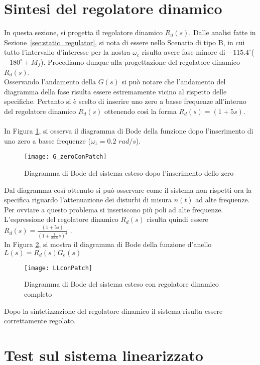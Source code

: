 \documentclass[a4paper, 11pt]{article}
\begin{document}
\section{Sintesi del regolatore dinamico}

In questa sezione, si progetta il regolatore dinamico $R_d(s)$. 
%
Dalle analisi fatte in Sezione~\ref{sec:static_regulator}, si nota di essere nello Scenario di tipo B, in cui tutto l'intervallo d'interesse per la nostra $\omega_c$ risulta avere fase minore di $-115.4^{\circ}$($-180^{\circ}+M_f$). Procediamo dunque alla progettazione del regolatore dinamico $R_d(s)$.
\\
Osservando l'andamento della $G(s)$ si può notare che l'andamento del diagramma della fase risulta essere estremamente vicino al rispetto delle specifiche. Pertanto si è scelto di inserire uno zero a basse frequenze all'interno del regolatore dinamico $R_d(s)$ ottenendo così la forma $R_d(s)=(1+5s)$.
\\
\\
In Figura \ref{Figura 4}, si osserva il diagramma di Bode della funzione dopo l'inserimento di uno zero a basse frequenze ($\omega_z=0.2$ $rad/s$).

\begin{figure}[H]
	\centering
	\texttt{[image: G\_zeroConPatch]}
	\caption[]{Diagramma di Bode del sistema esteso dopo l'inserimento dello zero}
	\label{Figura 4}
\end{figure}

Dal diagramma così ottenuto si può osservare come il sistema non rispetti ora la specifica riguardo l'attenuazione dei disturbi di misura $n(t)$ ad alte frequenze.
\\
Per ovviare a questo problema si inseriscono più poli ad alte frequenze. L'espressione del regolatore dinamico $R_d(s)$ risulta quindi essere $R_d(s)=\frac{(1+5s)}{(1+\frac{1}{2000}s)^4}$ .
\\

In Figura \ref{Figura 5}, si mostra il diagramma di Bode della funzione d'anello $L(s) = R_d(s) G_e(s)$

\begin{figure}[H]
	\centering
	\texttt{[image: LLconPatch]}
	\caption[]{Diagramma di Bode del sistema esteso con regolatore dinamico completo}
	\label{Figura 5}
\end{figure}

Dopo la sintetizzazione del regolatore dinamico il sistema risulta essere correttamente regolato.
\section{Test sul sistema linearizzato}
\label{sec:testsistemalinearizzato}
\end{document}
